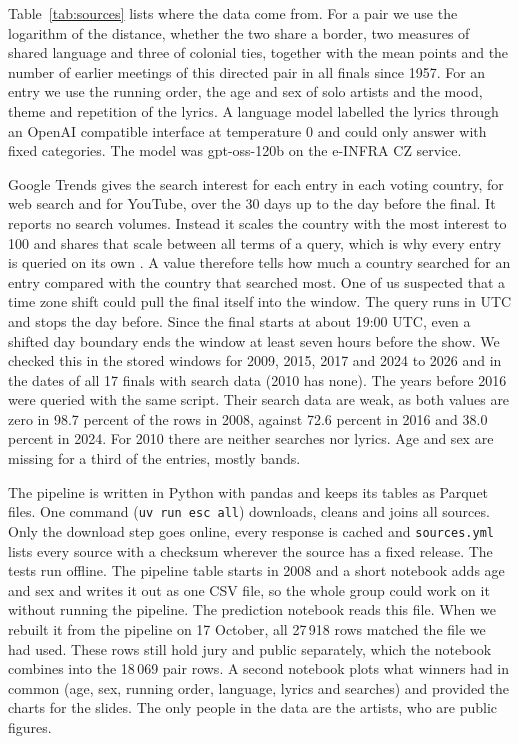 

Table~\ref{tab:sources} lists where the data come from. For a pair we use the logarithm of the distance, whether the two share a border, two measures of shared language and three of colonial ties, together with the mean points and the number of earlier meetings of this directed pair in all finals since 1957. For an entry we use the running order, the age and sex of solo artists and the mood, theme and repetition of the lyrics. A language model labelled the lyrics through an OpenAI compatible interface at temperature 0 and could only answer with fixed categories. The model was gpt-oss-120b on the e-INFRA CZ service.

Google Trends gives the search interest for each entry in each voting country, for web search and for YouTube, over the 30 days up to the day before the final. It reports no search volumes. Instead it scales the country with the most interest to 100 and shares that scale between all terms of a query, which is why every entry is queried on its own \citep{googletrends}. A value therefore tells how much a country searched for an entry compared with the country that searched most. One of us suspected that a time zone shift could pull the final itself into the window. The query runs in UTC and stops the day before. Since the final starts at about 19:00 UTC, even a shifted day boundary ends the window at least seven hours before the show. We checked this in the stored windows for 2009, 2015, 2017 and 2024 to 2026 and in the dates of all 17 finals with search data (2010 has none). The years before 2016 were queried with the same script. Their search data are weak, as both values are zero in 98.7 percent of the rows in 2008, against 72.6 percent in 2016 and 38.0 percent in 2024. For 2010 there are neither searches nor lyrics. Age and sex are missing for a third of the entries, mostly bands.

The pipeline is written in Python with pandas and keeps its tables as Parquet files. One command (\texttt{uv run esc all}) downloads, cleans and joins all sources. Only the download step goes online, every response is cached and \texttt{sources.yml} lists every source with a checksum wherever the source has a fixed release. The tests run offline. The pipeline table starts in 2008 and a short notebook adds age and sex and writes it out as one CSV file, so the whole group could work on it without running the pipeline. The prediction notebook reads this file. When we rebuilt it from the pipeline on 17 October, all 27\,918 rows matched the file we had used. These rows still hold jury and public separately, which the notebook combines into the 18\,069 pair rows. A second notebook plots what winners had in common (age, sex, running order, language, lyrics and searches) and provided the charts for the slides. The only people in the data are the artists, who are public figures.


